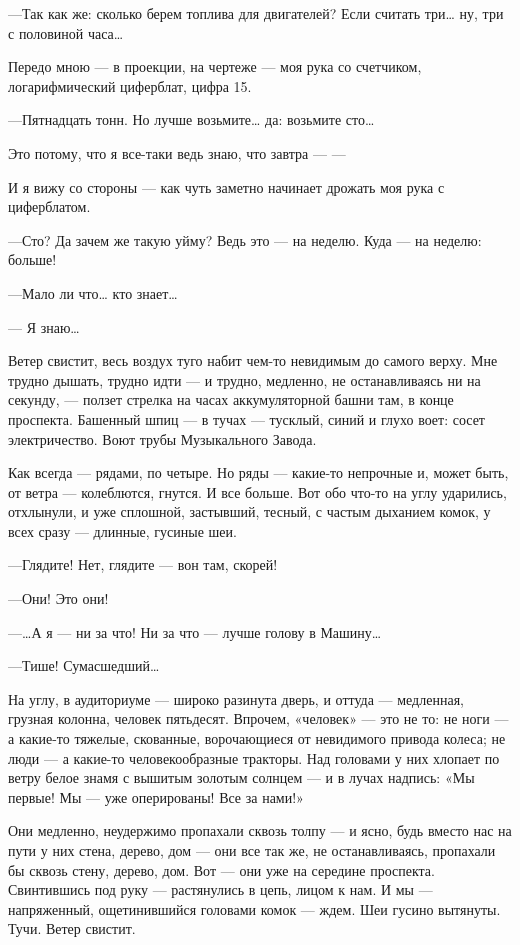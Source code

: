 \documentclass[11pt,openany]{book}
\begin{document}
---Так как же: сколько берем топлива для двигателей? Если считать три\ldots{} ну, три с половиной часа\ldots{}

Передо мною --- в проекции, на чертеже --- моя рука со счетчиком, логарифмический циферблат, цифра 15.

---Пятнадцать тонн. Но лучше возьмите\ldots{} да: возьмите сто\ldots{}

Это потому, что я все-таки ведь знаю, что завтра --- ---

И я вижу со стороны --- как чуть заметно начинает дрожать моя рука с циферблатом.

---Сто? Да зачем же такую уйму? Ведь это --- на неделю. Куда --- на неделю: больше!

---Мало ли что\ldots{} кто знает\ldots{}

--- Я знаю\ldots{}

Ветер свистит, весь воздух туго набит чем-то невидимым до самого верху. Мне трудно дышать, трудно идти --- и трудно, медленно, не останавливаясь ни на секунду, --- ползет стрелка на часах аккумуляторной башни там, в конце проспекта. Башенный шпиц --- в тучах --- тусклый, синий и глухо воет: сосет электричество. Воют трубы Музыкального Завода.

Как всегда --- рядами, по четыре. Но ряды --- какие-то непрочные и, может быть, от ветра --- колеблются, гнутся. И все больше. Вот обо что-то на углу ударились, отхлынули, и уже сплошной, застывший, тесный, с частым дыханием комок, у всех сразу --- длинные, гусиные шеи.

---Глядите! Нет, глядите --- вон там, скорей!

---Они! Это они!

---\ldots{}А я --- ни за что! Ни за что --- лучше голову в Машину\ldots{}

---Тише! Сумасшедший\ldots{}

На углу, в аудиториуме --- широко разинута дверь, и оттуда --- медленная, грузная колонна, человек пятьдесят. Впрочем, «человек» --- это не то: не ноги --- а какие-то тяжелые, скованные, ворочающиеся от невидимого привода колеса; не люди --- а какие-то человекообразные тракторы. Над головами у них хлопает по ветру белое знамя с вышитым золотым солнцем --- и в лучах надпись: «Мы первые! Мы --- уже оперированы! Все за нами!»

Они медленно, неудержимо пропахали сквозь толпу --- и ясно, будь вместо нас на пути у них стена, дерево, дом --- они все так же, не останавливаясь, пропахали бы сквозь стену, дерево, дом. Вот --- они уже на середине проспекта. Свинтившись под руку --- растянулись в цепь, лицом к нам. И мы --- напряженный, ощетинившийся головами комок --- ждем. Шеи гусино вытянуты. Тучи. Ветер свистит.
\end{document}
